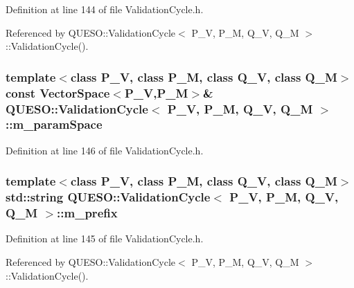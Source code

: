Definition at line 144 of file Validation\-Cycle.\-h.



Referenced by Q\-U\-E\-S\-O\-::\-Validation\-Cycle$<$ P\-\_\-\-V, P\-\_\-\-M, Q\-\_\-\-V, Q\-\_\-\-M $>$\-::\-Validation\-Cycle().

\hypertarget{class_q_u_e_s_o_1_1_validation_cycle_a641d2e59aed41a93a787c71ec30b6e07}{
\subsubsection[{m\-\_\-param\-Space}]{\setlength{\rightskip}{0pt plus 5cm}template$<$class P\-\_\-\-V, class P\-\_\-\-M, class Q\-\_\-\-V, class Q\-\_\-\-M$>$ const {\bf Vector\-Space}$<$P\-\_\-\-V,P\-\_\-\-M$>$\& {\bf Q\-U\-E\-S\-O\-::\-Validation\-Cycle}$<$ P\-\_\-\-V, P\-\_\-\-M, Q\-\_\-\-V, Q\-\_\-\-M $>$\-::m\-\_\-param\-Space\hspace{0.3cm}{\ttfamily [private]}}}\label{class_q_u_e_s_o_1_1_validation_cycle_a641d2e59aed41a93a787c71ec30b6e07}


Definition at line 146 of file Validation\-Cycle.\-h.

\hypertarget{class_q_u_e_s_o_1_1_validation_cycle_adcc61017a11c99f3a6189ddbf7bc76fc}{
\subsubsection[{m\-\_\-prefix}]{\setlength{\rightskip}{0pt plus 5cm}template$<$class P\-\_\-\-V, class P\-\_\-\-M, class Q\-\_\-\-V, class Q\-\_\-\-M$>$ std\-::string {\bf Q\-U\-E\-S\-O\-::\-Validation\-Cycle}$<$ P\-\_\-\-V, P\-\_\-\-M, Q\-\_\-\-V, Q\-\_\-\-M $>$\-::m\-\_\-prefix\hspace{0.3cm}{\ttfamily [private]}}}\label{class_q_u_e_s_o_1_1_validation_cycle_adcc61017a11c99f3a6189ddbf7bc76fc}


Definition at line 145 of file Validation\-Cycle.\-h.



Referenced by Q\-U\-E\-S\-O\-::\-Validation\-Cycle$<$ P\-\_\-\-V, P\-\_\-\-M, Q\-\_\-\-V, Q\-\_\-\-M $>$\-::\-Validation\-Cycle().

